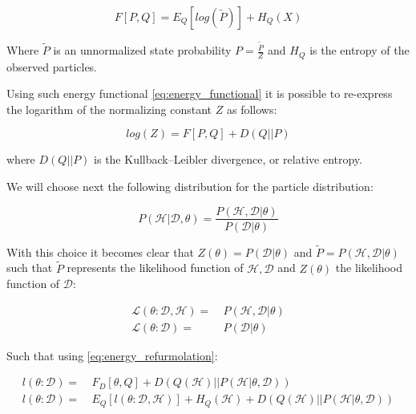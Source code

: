 \documentclass[11pt]{article}
\begin{document}
\begin{article}
\begin{equation} \label{eq:energy_functional}
F[P, Q] = E_Q[log (\tilde{P})] + H_Q (X)
\end{equation}

Where \(\tilde{P}\) is an unnormalized state probability \(P =
  \frac{\tilde{P}}{Z}\) and \(H_Q\) is the entropy of the observed
particles. 

Using such energy functional \ref{eq:energy_functional} it is possible
to re-express the logarithm of the normalizing constant \(Z\) as
follows:

\begin{equation} \label{eq:energy_refurmolation}
log (Z) = F[P, Q] + D (Q||P)
\end{equation}  

where \(D(Q||P)\) is the Kullback–Leibler divergence, or relative
entropy.

We will choose next the following distribution for the particle
distribution:

\begin{equation} \label{eq:particle_distribution}
P (\mathscr{H} | \mathscr{D}, \theta) =   \frac{P (\mathscr{H}, \mathscr{D}| \theta)}{P (\mathscr{D}| \theta)}
\end{equation}

With this choice it becomes clear that \(Z (\theta) = P (\mathscr{D}|
  \theta)\) and \(\tilde{P} = P (\mathscr{H}, \mathscr{D}| \theta)\) such
that \(\tilde{P}\) represents the likelihood function of \(\mathscr{H},
  \mathscr{D}\) and \(Z (\theta)\) the likelihood function of
\(\mathscr{D}\):

\begin{align} \label{eq:likelihood_particle}
\mathscr{L} (\theta: \mathscr{D}, \mathscr{H}) =& \ P (\mathscr{H}, \mathscr{D}| \theta)\\
\mathscr{L} (\theta: \mathscr{D}) =& \ P (\mathscr{D}| \theta)
\end{align}

Such that using \ref{eq:energy_refurmolation}:

\begin{align} \label{eq:likelihood_energy_functional_relation}
l (\theta: \mathscr{D}) =& \ F_D[\theta, Q] + D (Q (\mathscr{H}) || P (\mathscr{H}| \theta, \mathscr{D})) \\
l (\theta: \mathscr{D}) =& \ E_Q[l (\theta: \mathscr{D}, \mathscr{H})]+ H_Q (\mathscr {H}) + D (Q (\mathscr{H}) || P (\mathscr{H}| \theta, \mathscr{D}))
\end{align}


\end{article}
\end{document}
